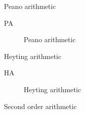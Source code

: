 \begin{plSection}{Peano arithmetic}
 
\begin{description}
\item[\textsf{PA}] Peano arithmetic~\cite{wiki:PeanoAxioms}
\end{description}

\end{plSection}

\begin{plSection}{Heyting arithmetic}
 
\begin{description}
\item[\textsf{HA}] Heyting arithmetic~\cite{wiki:HeytingArithmetic}
\end{description}
\end{plSection}
\begin{plSection}{Second order arithmetic}
\label{sec:Second_order_arithmetic}
\cite{wiki:SecondOrderArithmetic}
\end{plSection}
